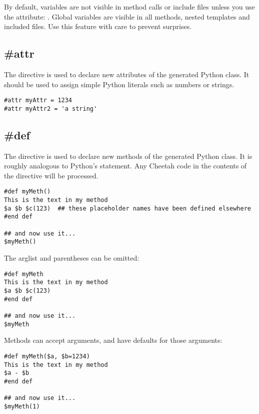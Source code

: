 By default,  variables are not visible in method calls or include
files unless you use the  attribute: .  Global variables are visible in all methods, nested templates and
included files.  Use this feature with care to prevent surprises.


\subsection{\#attr}
\label{inheritanceEtc.attr}

The  directive is used to declare new attributes of the generated Python
class.  It should be used to assign simple Python literals such as numbers or
strings.  

\begin{verbatim}
#attr myAttr = 1234
#attr myAttr2 = 'a string'
\end{verbatim}


\subsection{\#def}
\label{inheritanceEtc.def}

The  directive is used to declare new methods of the generated Python
class.  It is roughly analogous to Python's  statement.  Any Cheetah
code in the contents of the  directive will be processed.  

\begin{verbatim}
#def myMeth()
This is the text in my method 
$a $b $c(123)  ## these placeholder names have been defined elsewhere
#end def

## and now use it...
$myMeth()
\end{verbatim}

The arglist and parentheses can be omitted:
\begin{verbatim}
#def myMeth
This is the text in my method 
$a $b $c(123)
#end def

## and now use it...
$myMeth
\end{verbatim}

Methods can accept arguments, and have defaults for those arguments:
\begin{verbatim}
#def myMeth($a, $b=1234)
This is the text in my method 
$a - $b
#end def

## and now use it...
$myMeth(1)
\end{verbatim}

